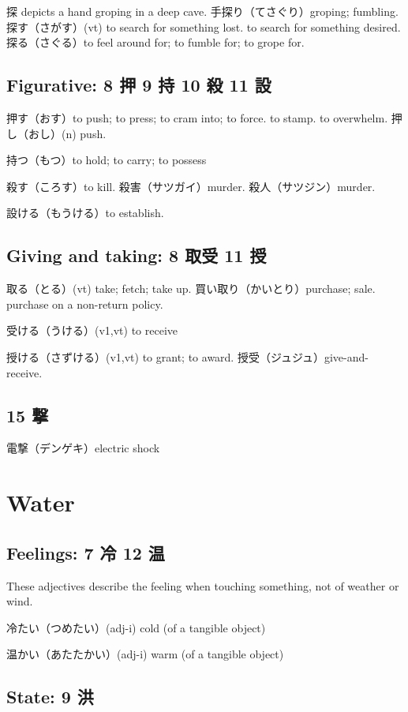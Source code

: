探 depicts a hand groping in a deep cave.
手探り（てさぐり）groping; fumbling.
探す（さがす）(vt)
to search for something lost.
to search for something desired.
探る（さぐる）to feel around for; to fumble for; to grope for.

\subsection{Figurative: 8 押 9 持 10 殺 11 設}

押す（おす）to push; to press; to cram into; to force.
to stamp.
to overwhelm.
押し（おし）(n) push.

持つ（もつ）to hold; to carry; to possess

殺す（ころす）to kill.
殺害（サツガイ）murder.
殺人（サツジン）murder.

設ける（もうける）to establish.

\subsection{Giving and taking: 8 取受 11 授}

取る（とる）(vt) take; fetch; take up.
買い取り（かいとり）purchase; sale. purchase on a non-return policy.

受ける（うける）(v1,vt) to receive

授ける（さずける）(v1,vt) to grant; to award.
授受（ジュジュ）give-and-receive.

\subsection{15 撃}

電撃（デンゲキ）electric shock

\section{Water}

\subsection{Feelings: 7 冷 12 温}

These adjectives describe the feeling when
touching something, not of weather or wind.

冷たい（つめたい）(adj-i) cold (of a tangible object)

温かい（あたたかい）(adj-i) warm (of a tangible object)

\subsection{State: 9 洪}

